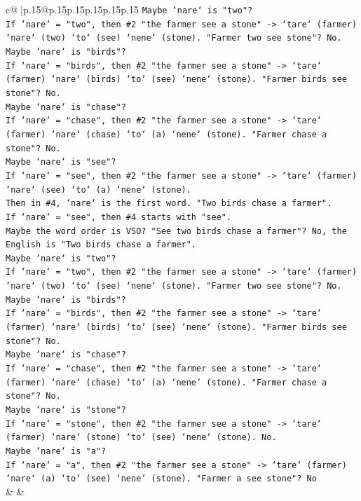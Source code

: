 \documentclass{article}
\begin{document}
{\begin{supertabular}{c@{$\;$}|p{.15\linewidth}@{}p{.15\linewidth}p{.15\linewidth}p{.15\linewidth}p{.15\linewidth}p{.15\linewidth}}
{{{\texttt{Maybe `nare` is "two"?} \\
\texttt{If `nare` = "two", then \#2 "the farmer see a stone" {-}> `tare` (farmer) `nare` (two) `to` (see) `nene` (stone). "Farmer two see stone"? No.} \\
\texttt{Maybe `nare` is "birds"?} \\
\texttt{If `nare` = "birds", then \#2 "the farmer see a stone" {-}> `tare` (farmer) `nare` (birds) `to` (see) `nene` (stone). "Farmer birds see stone"? No.} \\
\texttt{Maybe `nare` is "chase"?} \\
\texttt{If `nare` = "chase", then \#2 "the farmer see a stone" {-}> `tare` (farmer) `nare` (chase) `to` (a) `nene` (stone). "Farmer chase a stone"? No.} \\
\texttt{Maybe `nare` is "see"?} \\
\texttt{If `nare` = "see", then \#2 "the farmer see a stone" {-}> `tare` (farmer) `nare` (see) `to` (a) `nene` (stone).} \\
\texttt{Then in \#4, `nare` is the first word. "Two birds chase a farmer".} \\
\texttt{If `nare` = "see", then \#4 starts with "see".} \\
\texttt{Maybe the word order is VSO? "See two birds chase a farmer"? No, the English is "Two birds chase a farmer".} \\
\texttt{Maybe `nare` is "two"?} \\
\texttt{If `nare` = "two", then \#2 "the farmer see a stone" {-}> `tare` (farmer) `nare` (two) `to` (see) `nene` (stone). "Farmer two see stone"? No.} \\
\texttt{Maybe `nare` is "birds"?} \\
\texttt{If `nare` = "birds", then \#2 "the farmer see a stone" {-}> `tare` (farmer) `nare` (birds) `to` (see) `nene` (stone). "Farmer birds see stone"? No.} \\
\texttt{Maybe `nare` is "chase"?} \\
\texttt{If `nare` = "chase", then \#2 "the farmer see a stone" {-}> `tare` (farmer) `nare` (chase) `to` (a) `nene` (stone). "Farmer chase a stone"? No.} \\
\texttt{Maybe `nare` is "stone"?} \\
\texttt{If `nare` = "stone", then \#2 "the farmer see a stone" {-}> `tare` (farmer) `nare` (stone) `to` (see) `nene` (stone). No.} \\
\texttt{Maybe `nare` is "a"?} \\
\texttt{If `nare` = "a", then \#2 "the farmer see a stone" {-}> `tare` (farmer) `nare` (a) `to` (see) `nene` (stone). "Farmer a see stone"? No} \\
            }
        }
    }
    & & \\ \\


\end{supertabular}}
\end{document}
